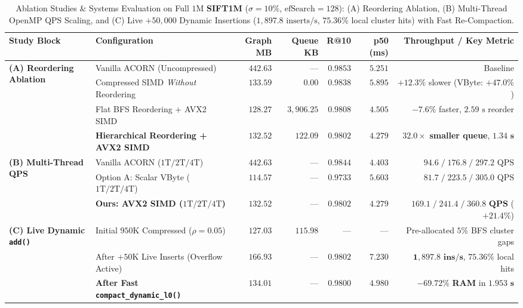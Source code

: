 \begin{table}[t]
\centering
\caption{Ablation Studies \& Systems Evaluation on Full $1\text{M}$ \textbf{SIFT1M} ($\sigma=10\%$, $\text{efSearch}=128$): (A) Reordering Ablation, (B) Multi-Thread OpenMP QPS Scaling, and (C) Live $+50{,}000$ Dynamic Insertions ($1{,}897.8\text{ inserts/s}$, $75.36\%$ local cluster hits) with Fast Re-Compaction.}
\label{tab:ablations}
\small
\begin{tabular}{@{}llrrrrr@{}}
\toprule
\textbf{Study Block} & \textbf{Configuration} & \textbf{Graph MB} & \textbf{Queue KB} & \textbf{R@10} & \textbf{p50 (ms)} & \textbf{Throughput / Key Metric} \\
\midrule
\multirow{4}{*}{\textbf{(A) Reordering Ablation}}
 & Vanilla ACORN (Uncompressed) & $442.63$ & --- & $0.9853$ & $5.251$ & Baseline \\
 & Compressed SIMD \emph{Without} Reordering & $133.59$ & $0.00$ & $0.9838$ & $5.895$ & $+12.3\%$ slower (VByte: $+47.0\%$) \\
 & Flat BFS Reordering + AVX2 SIMD & $128.27$ & $3{,}906.25$ & $0.9808$ & $4.505$ & $-7.6\%$ faster, $2.59\text{ s}$ reorder \\
 & \textbf{Hierarchical Reordering + AVX2 SIMD} & $\mathbf{132.52}$ & $\mathbf{122.09}$ & $\mathbf{0.9802}$ & $\mathbf{4.279}$ & $\mathbf{32.0\times}$ \textbf{smaller queue}, $\mathbf{1.34\text{ s}}$ \\
\midrule
\multirow{3}{*}{\textbf{(B) Multi-Thread QPS}}
 & Vanilla ACORN ($1\text{T} / 2\text{T} / 4\text{T}$) & $442.63$ & --- & $0.9844$ & $4.403$ & $94.6 \;/\; 176.8 \;/\; 297.2\text{ QPS}$ \\
 & Option A: Scalar VByte ($1\text{T} / 2\text{T} / 4\text{T}$) & $114.57$ & --- & $0.9733$ & $5.603$ & $81.7 \;/\; 223.5 \;/\; 305.0\text{ QPS}$ \\
 & \textbf{Ours: AVX2 SIMD ($1\text{T} / 2\text{T} / 4\text{T}$)} & $\mathbf{132.52}$ & --- & $\mathbf{0.9802}$ & $\mathbf{4.279}$ & $\mathbf{169.1 \;/\; 241.4 \;/\; 360.8\text{ QPS}}$ ($\mathbf{+21.4\%}$) \\
\midrule
\multirow{3}{*}{\textbf{(C) Live Dynamic \texttt{add()}}}
 & Initial $950\text{K}$ Compressed ($\rho=0.05$) & $127.03$ & $115.98$ & --- & --- & Pre-allocated $5\%$ BFS cluster gaps \\
 & After $+50\text{K}$ Live Inserts (Overflow Active) & $166.93$ & --- & $0.9802$ & $7.230$ & $\mathbf{1{,}897.8\text{ ins/s}}$, $75.36\%$ local hits \\
 & \textbf{After Fast \texttt{compact\_dynamic\_l0()}} & $\mathbf{134.01}$ & --- & $\mathbf{0.9800}$ & $\mathbf{4.980}$ & $\mathbf{-69.72\%}$ \textbf{RAM} in $\mathbf{1.953\text{ s}}$ \\
\bottomrule
\end{tabular}
\end{table}
